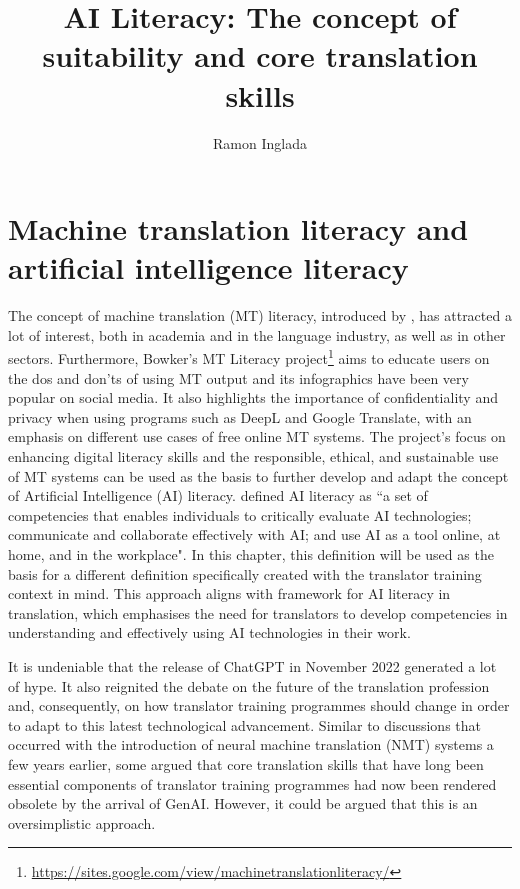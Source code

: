\documentclass[output=paper]{langscibook}
\author{Ramon Inglada\orcid{}\affiliation{Heriot-Watt University, United Kingdom}}
\title{AI Literacy: The concept of suitability and core translation skills}
\begin{document}
\maketitle





\section{Machine translation literacy and artificial intelligence literacy}
The concept of machine translation (MT) literacy, introduced by \citet{bowkerbuitrago19}, has attracted a lot of interest, both in academia and in the language industry, as well as in other sectors. Furthermore, Bowker’s MT Literacy project\footnote{\url{https://sites.google.com/view/machinetranslationliteracy/}} aims to educate users on the dos and don'ts of using MT output and its infographics have been very popular on social media. It also highlights the importance of confidentiality and privacy when using programs such as DeepL and Google Translate, with an emphasis on different use cases of free online MT systems. The project's focus on enhancing digital literacy skills and the responsible, ethical, and sustainable use of MT systems can be used as the basis to further develop and adapt the concept of Artificial Intelligence (AI) literacy. \citet[2]{longmagerko2020} defined AI literacy as ``a set of competencies that enables individuals to critically evaluate AI technologies; communicate and collaborate effectively with AI; and use AI as a tool online, at home, and in the workplace". In this chapter, this definition will be used as the basis for a different definition specifically created with the translator training context in mind. This approach aligns with \citep{kruger24_AI_literacy_framework} framework for AI literacy in translation, which emphasises the need for translators to develop competencies in understanding and effectively using AI technologies in their work.

It is undeniable that the release of ChatGPT in November 2022 generated a lot of hype. It also reignited the debate on the future of the translation profession and, consequently, on how translator training programmes should change in order to adapt to this latest technological advancement. Similar to discussions that occurred with the introduction of neural machine translation (NMT) systems a few years earlier, some argued that core translation skills that have long been essential components of translator training programmes had now been rendered obsolete by the arrival of GenAI. However, it could be argued that this is an oversimplistic approach.
\end{document}

